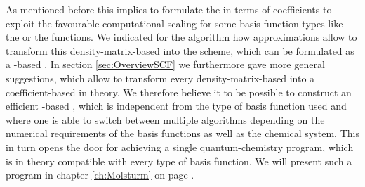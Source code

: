As mentioned before this implies to formulate the \SCF in terms of coefficients
to exploit the favourable computational scaling
for some basis function types like the \FE or the \CS functions.
We indicated for the \ODA algorithm
how approximations allow to transform this density-matrix-based
\SCF into the \tODA scheme,
which can be formulated as a \contraction-based \SCF.
In section \vref{sec:OverviewSCF} we furthermore gave more general suggestions,
which allow to transform every density-matrix-based \SCF
into a coefficient-based \SCF in theory.
We therefore believe it to be possible
to construct an efficient \contraction-based \SCF,
which is independent from the type of basis function used
and where one is able to switch between
multiple algorithms depending on the numerical requirements of the basis functions
as well as the chemical system.
This in turn opens the door
for achieving a single quantum-chemistry program,
which is in theory compatible with every type of basis function.
We will present such a program in chapter \ref{ch:Molsturm}
on page \pageref{ch:Molsturm}.
